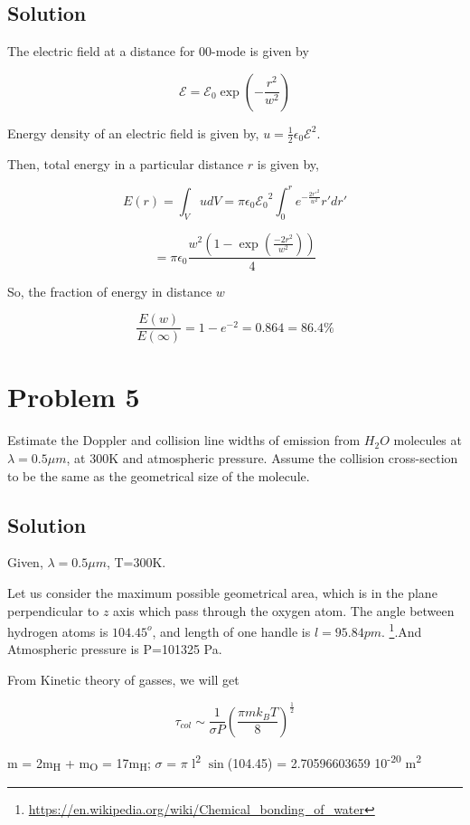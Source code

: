 \documentclass[a4paper,11pt]{article}
\begin{document}
\subsection*{Solution}
\label{sec:org5bbf05d}
The electric field at a distance for 00-mode is given by

$$\mathcal{E}=\mathcal{E}_0\exp\left(-\frac{r^2}{w^2}\right)$$

Energy density of an electric field is given by, \(u=\frac{1}{2}\epsilon_0\mathcal{E}^2\). 

Then, total energy in a particular distance \(r\) is given by,

$$E(r) = \int_V udV = \pi \epsilon_0 \mathcal{E_0}^2\int_0^r e^{-\frac{2r'^2}{w^2}} r'dr' $$ 

$$=\pi\epsilon_0\frac{w^2\left(1-\exp\left( \frac{-2 r^2}{w^2}\right)\right)}{4}$$

So, the fraction of energy in distance \(w\)

$$\frac{E(w)}{E(\infty)} = 1-e^{-2}=0.864 = 86.4\%$$

\section*{Problem 5}
\label{sec:org07d70a8}
Estimate the Doppler and collision line widths of emission from \(H_2O\) molecules at \(\lambda = 0.5\mu m\), at 300K and atmospheric pressure. Assume the collision cross-section to be the same as the geometrical size of the molecule.

\subsection*{Solution}
\label{sec:org7551358}
Given, \(\lambda = 0.5\mu m\), T=300K.

Let us consider the maximum possible geometrical area, which is in the plane perpendicular to \(z\) axis which pass through the oxygen atom. The angle between hydrogen atoms is \(104.45^o\), and length of one handle is \(l=95.84 pm\). \footnote{\url{https://en.wikipedia.org/wiki/Chemical\_bonding\_of\_water}}.And Atmospheric pressure is P=101325 Pa.

From Kinetic theory of gasses, we will get

\begin{equation}
\label{eq:org609bada}
\tau_{col} \sim \frac{1}{\sigma P} \left(\frac{\pi m k_B T}{8}\right)^{\frac{1}{2}}
\end{equation}

m = 2m\textsubscript{H} + m\textsubscript{O} = 17m\textsubscript{H};
\(\sigma\) = \(\pi\) l\textsuperscript{2} \(\sin\)(104.45) = 2.70596603659\texttimes{} 10\textsuperscript{-20} m\textsuperscript{2} 
\end{document}
